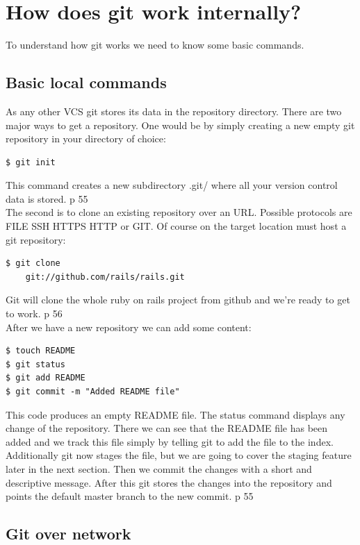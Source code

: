 \section{How does git work internally?}

To understand how git works we need to know some basic commands.

\subsection {Basic local commands}

As any other VCS git stores its data in the repository directory.
There are two major ways to get a repository.
One would be by simply creating a new empty git repository in your directory of choice:
\begin{lstlisting}
$ git init
\end{lstlisting}
This command creates a new subdirectory .git/ where all your version control
data is stored. \cite{gitinternals2008} p 55 \\
The second is to clone an existing repository over an URL. Possible protocols
are FILE SSH HTTPS HTTP or GIT. Of course on the target location must host a
git repository:
\begin{lstlisting}
$ git clone 
    git://github.com/rails/rails.git
\end{lstlisting}
Git will clone the whole ruby on rails project from github and we're
ready to get to work. \cite{gitinternals2008} p 56 \\

After we have a new repository we can add some content:
\begin{lstlisting}
$ touch README
$ git status
$ git add README
$ git commit -m "Added README file"
\end{lstlisting}

This code produces an empty README file. The status command displays any change
of the repository. There we can see that the README file has been added and we
track this file simply by telling git to add the file to the index. Additionally
git now stages the file, but we are going to cover the staging feature later in the next
section. Then we commit the changes with a short and descriptive message. After
this git stores the changes into the repository and points the default master
branch to the new commit. \cite{gitinternals2008} p 55 \\

\subsection{Git over network}

